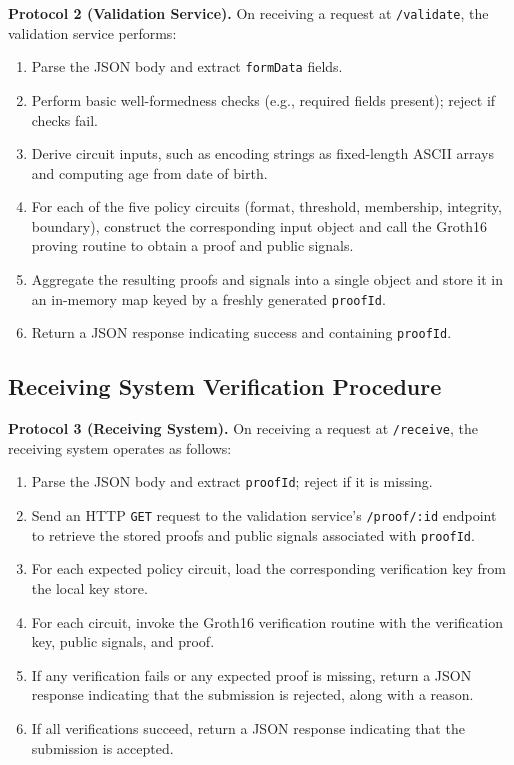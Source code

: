\textbf{Protocol 2 (Validation Service).} On receiving a request at
\texttt{/validate}, the validation service performs:

\begin{enumerate}[leftmargin=*]
  \item Parse the JSON body and extract \texttt{formData} fields.
  \item Perform basic well-formedness checks (e.g., required fields present);
        reject if checks fail.
  \item Derive circuit inputs, such as encoding strings as fixed-length ASCII
        arrays and computing age from date of birth.
  \item For each of the five policy circuits (format, threshold, membership,
        integrity, boundary), construct the corresponding input object and call
        the Groth16 proving routine to obtain a proof and public signals.
  \item Aggregate the resulting proofs and signals into a single object and
        store it in an in-memory map keyed by a freshly generated
        \texttt{proofId}.
  \item Return a JSON response indicating success and containing \texttt{proofId}.
\end{enumerate}

\subsection{Receiving System Verification Procedure}

\textbf{Protocol 3 (Receiving System).} On receiving a request at
\texttt{/receive}, the receiving system operates as follows:

\begin{enumerate}[leftmargin=*]
  \item Parse the JSON body and extract \texttt{proofId}; reject if it is
        missing.
  \item Send an HTTP \texttt{GET} request to the validation service's
        \texttt{/proof/:id} endpoint to retrieve the stored proofs and public
        signals associated with \texttt{proofId}.
  \item For each expected policy circuit, load the corresponding verification
        key from the local key store.
  \item For each circuit, invoke the Groth16 verification routine with the
        verification key, public signals, and proof.
  \item If any verification fails or any expected proof is missing, return a
        JSON response indicating that the submission is rejected, along with a
        reason.
  \item If all verifications succeed, return a JSON response indicating that
        the submission is accepted.
\end{enumerate}


